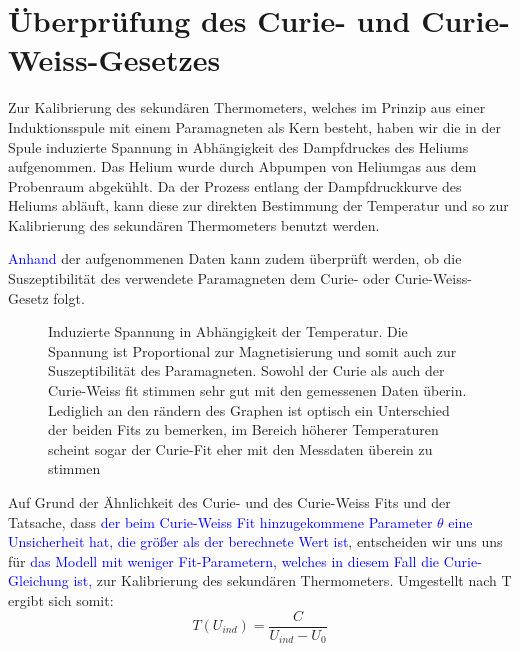 \documentclass[bigchapter,colorback,accentcolor=tud4b,linedtoc,11pt]{tudreport}
\begin{document}
\section{Überprüfung des Curie- und Curie-Weiss-Gesetzes}
Zur Kalibrierung des sekundären Thermometers, welches im Prinzip aus einer
Induktionsspule mit einem Paramagneten als Kern besteht, haben wir die in der
Spule induzierte Spannung in Abhängigkeit des Dampfdruckes des Heliums
aufgenommen. Das Helium wurde durch Abpumpen von Heliumgas aus dem Probenraum
abgekühlt. Da der Prozess entlang der Dampfdruckkurve des Heliums abläuft, kann
diese zur direkten Bestimmung der Temperatur und so zur Kalibrierung des
sekundären Thermometers benutzt werden.

\textcolor{blue}{Anhand} der aufgenommenen Daten kann zudem überprüft werden, ob die Suszeptibilität
des verwendete Paramagneten dem Curie- oder Curie-Weiss-Gesetz folgt.
\begin{figure}[H]
    \caption{Induzierte Spannung in Abhängigkeit der Temperatur. Die Spannung
        ist Proportional zur Magnetisierung und somit auch zur Suszeptibilität des
        Paramagneten. Sowohl der Curie als auch der Curie-Weiss fit stimmen sehr gut
        mit den gemessenen Daten überin. Lediglich an den rändern des Graphen ist
        optisch ein Unterschied der beiden Fits zu bemerken, im Bereich höherer
        Temperaturen scheint sogar der Curie-Fit eher mit den Messdaten überein zu stimmen}
\end{figure}

Auf Grund der Ähnlichkeit des Curie- und des Curie-Weiss Fits und der Tatsache,
dass \textcolor{blue}{der beim Curie-Weiss Fit hinzugekommene Parameter $\theta$
eine Unsicherheit hat, die größer als der berechnete Wert ist}, entscheiden wir
uns uns für \textcolor{blue}{das Modell mit weniger Fit-Parametern, welches in
  diesem Fall die Curie-Gleichung ist,} zur Kalibrierung des sekundären
Thermometers. Umgestellt nach T ergibt sich somit:
$$T(U_{ind}) = \frac{C}{U_{ind}-U_0}$$ 
\end{document}
